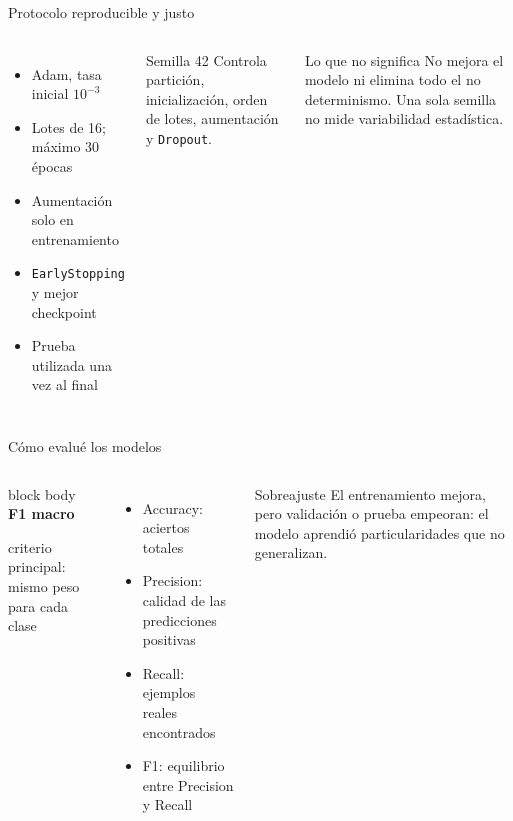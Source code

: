 \documentclass[aspectratio=169,11pt]{beamer}
\newcommand{\dato}[2]{%
\begin{beamercolorbox}[rounded=true,sep=.55em,center,wd=.95\linewidth]{block body}
{\color{Azul}\Large\bfseries #1}\par\smallskip
{\small #2}
\end{beamercolorbox}}
\begin{document}
\begin{frame}{Protocolo reproducible y justo}
\begin{columns}[T,onlytextwidth]
\begin{itemize}\setlength\itemsep{.5em}
\item Adam, tasa inicial $10^{-3}$
\item Lotes de 16; máximo 30 épocas
\item Aumentación solo en entrenamiento
\item \texttt{EarlyStopping} y mejor checkpoint
\item Prueba utilizada una vez al final
\end{itemize}
\begin{block}{Semilla 42}
Controla partición, inicialización, orden de lotes, aumentación y \texttt{Dropout}.
\end{block}
\vspace{.25cm}
\begin{alertblock}{Lo que no significa}
No mejora el modelo ni elimina todo el no determinismo. Una sola semilla no mide variabilidad estadística.
\end{alertblock}
\end{columns}
\end{frame}

\begin{frame}{Cómo evalué los modelos}
\begin{columns}[T,onlytextwidth]
\dato{F1 macro}{criterio principal: mismo peso para cada clase}
\vspace{.35cm}
\begin{itemize}\setlength\itemsep{.42em}
\item Accuracy: aciertos totales
\item Precision: calidad de las predicciones positivas
\item Recall: ejemplos reales encontrados
\item F1: equilibrio entre Precision y Recall
\end{itemize}
\begin{block}{Sobreajuste}
El entrenamiento mejora, pero validación o prueba empeoran: el modelo aprendió particularidades que no generalizan.
\end{block}
\vspace{.25cm}
\centering
{}
\end{columns}
\end{frame}
\end{document}
